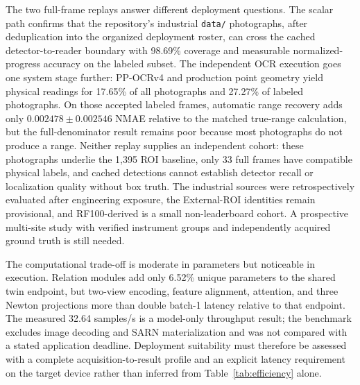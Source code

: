 \documentclass[electronics,article,submit,oneauthor]{Definitions/mdpi}
\begin{document}
The two full-frame replays answer different deployment questions. The scalar path confirms that the repository's industrial \texttt{data/} photographs, after deduplication into the organized deployment roster, can cross the cached detector-to-reader boundary with 98.69\% coverage and measurable normalized-progress accuracy on the labeled subset. The independent OCR execution goes one system stage further: PP-OCRv4 and production point geometry yield physical readings for 17.65\% of all photographs and 27.27\% of labeled photographs. On those accepted labeled frames, automatic range recovery adds only $0.002478\pm0.002546$ NMAE relative to the matched true-range calculation, but the full-denominator result remains poor because most photographs do not produce a range. Neither replay supplies an independent cohort: these photographs underlie the 1,395 ROI baseline, only 33 full frames have compatible physical labels, and cached detections cannot establish detector recall or localization quality without box truth. The industrial sources were retrospectively evaluated after engineering exposure, the External-ROI identities remain provisional, and RF100-derived is a small non-leaderboard cohort. A prospective multi-site study with verified instrument groups and independently acquired ground truth is still needed.

The computational trade-off is moderate in parameters but noticeable in execution. Relation modules add only 6.52\% unique parameters to the shared twin endpoint, but two-view encoding, feature alignment, attention, and three Newton projections more than double batch-1 latency relative to that endpoint. The measured 32.64 samples/s is a model-only throughput result; the benchmark excludes image decoding and SARN materialization and was not compared with a stated application deadline. Deployment suitability must therefore be assessed with a complete acquisition-to-result profile and an explicit latency requirement on the target device rather than inferred from Table~\ref{tab:efficiency} alone.
\end{document}
